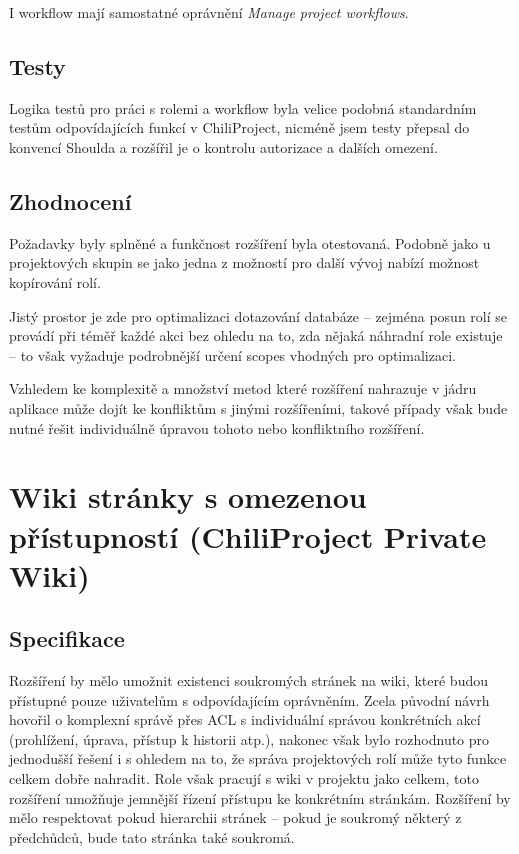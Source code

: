 \documentclass[thesis=B,czech]{FITthesis}[2012/05/02]
\begin{document}
I workflow mají samostatné oprávnění \emph{Manage project workflows}.

\subsection{Testy}

Logika testů pro práci s rolemi a workflow byla velice podobná
standardním testům odpovídajících funkcí v ChiliProject, nicméně jsem
testy přepsal do konvencí Shoulda a rozšířil je o kontrolu autorizace a
dalších omezení.

\subsection{Zhodnocení}

Požadavky byly splněné a funkčnost rozšíření byla otestovaná. Podobně
jako u projektových skupin se jako jedna z možností pro další vývoj
nabízí možnost kopírování rolí.

Jistý prostor je zde pro optimalizaci dotazování databáze -- zejména
posun rolí se provádí při téměř každé akci bez ohledu na to, zda nějaká
náhradní role existuje -- to však vyžaduje podrobnější určení
\glspl{scope} vhodných pro optimalizaci.

Vzhledem ke komplexitě a množství metod které rozšíření nahrazuje v
jádru aplikace může dojít ke konfliktům s jinými rozšířeními, takové
případy však bude nutné řešit individuálně úpravou tohoto nebo
konfliktního rozšíření.

\section{Wiki stránky s omezenou přístupností (ChiliProject Private
Wiki)}
\label{sec:private_wiki}

\subsection{Specifikace}

Rozšíření by mělo umožnit existenci soukromých stránek na \gls{wiki},
které budou přístupné pouze uživatelům s odpovídajícím oprávněním. Zcela
původní návrh hovořil o komplexní správě přes \gls{ACL} s individuální
správou konkrétních akcí (prohlížení, úprava, přístup k historii atp.),
nakonec však bylo rozhodnuto pro jednodušší řešení i s ohledem na to, že
správa projektových rolí může tyto funkce celkem dobře nahradit. Role
však pracují s wiki v projektu jako celkem, toto rozšíření umožňuje
jemnější řízení přístupu ke konkrétním stránkám. Rozšíření by mělo
respektovat pokud hierarchii stránek -- pokud je soukromý některý z
předchůdců, bude tato stránka také soukromá.
\end{document}
